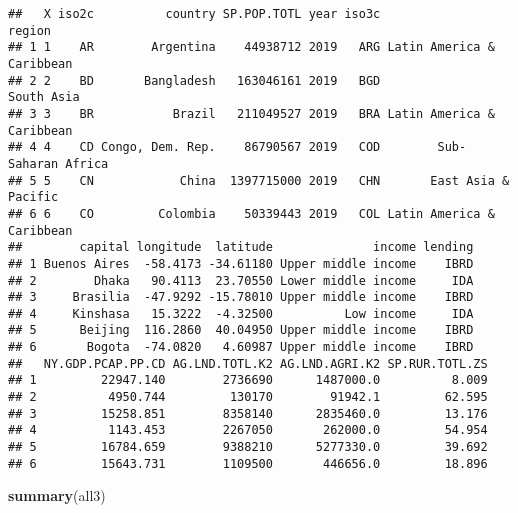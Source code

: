 \documentclass[
]{article}
\newenvironment{Shaded}{\begin{snugshade}}{\end{snugshade}}
\newcommand{\KeywordTok}[1]{\textcolor[rgb]{0.13,0.29,0.53}{\textbf{#1}}}
\newcommand{\NormalTok}[1]{#1}
\begin{document}
\begin{verbatim}
##   X iso2c          country SP.POP.TOTL year iso3c                    region
## 1 1    AR        Argentina    44938712 2019   ARG Latin America & Caribbean
## 2 2    BD       Bangladesh   163046161 2019   BGD                South Asia
## 3 3    BR           Brazil   211049527 2019   BRA Latin America & Caribbean
## 4 4    CD Congo, Dem. Rep.    86790567 2019   COD        Sub-Saharan Africa
## 5 5    CN            China  1397715000 2019   CHN       East Asia & Pacific
## 6 6    CO         Colombia    50339443 2019   COL Latin America & Caribbean
##        capital longitude  latitude              income lending
## 1 Buenos Aires  -58.4173 -34.61180 Upper middle income    IBRD
## 2        Dhaka   90.4113  23.70550 Lower middle income     IDA
## 3     Brasilia  -47.9292 -15.78010 Upper middle income    IBRD
## 4     Kinshasa   15.3222  -4.32500          Low income     IDA
## 5      Beijing  116.2860  40.04950 Upper middle income    IBRD
## 6       Bogota  -74.0820   4.60987 Upper middle income    IBRD
##   NY.GDP.PCAP.PP.CD AG.LND.TOTL.K2 AG.LND.AGRI.K2 SP.RUR.TOTL.ZS
## 1         22947.140        2736690      1487000.0          8.009
## 2          4950.744         130170        91942.1         62.595
## 3         15258.851        8358140      2835460.0         13.176
## 4          1143.453        2267050       262000.0         54.954
## 5         16784.659        9388210      5277330.0         39.692
## 6         15643.731        1109500       446656.0         18.896
\end{verbatim}

\begin{Shaded}
\begin{Highlighting}[]
\KeywordTok{summary}\NormalTok{(all3)}
\end{Highlighting}
\end{Shaded}
\end{document}
